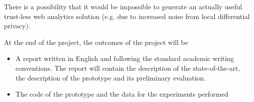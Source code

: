 \documentclass[a4paper]{article}
\begin{document}
\begin{description}[style=nextline]
    \item[Risks] There is a possibility that it would be impossible to generate 
an actually useful trust-less web analytics solution (e.g. due to increased 
noise from local differential privacy).

\item[Outcomes]
At the end of the project, the outcomes of the project will be
\begin{itemize}
\item A report written in English and following the standard academic writing
    conventions. The report will contain the description of the 
state-of-the-art, the description of the prototype and its preliminary 
evaluation.
\item The code of the prototype and the data for the experiments performed
\end{itemize}
   
\end{description}

\printbibliography
\end{document}

